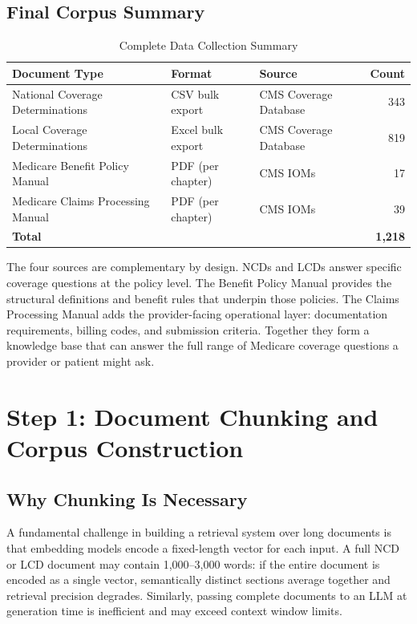 \documentclass[12pt, letterpaper]{article}
\begin{document}
\subsection{Final Corpus Summary}

\begin{table}[h]
\centering
\caption{Complete Data Collection Summary}
\label{tab:datasources}
\begin{tabular}{@{}p{4.8cm}p{3.2cm}p{3.8cm}r@{}}
\toprule
\textbf{Document Type} & \textbf{Format} & \textbf{Source} & \textbf{Count} \\
\midrule
National Coverage Determinations  & CSV bulk export   & CMS Coverage Database & 343 \\
Local Coverage Determinations     & Excel bulk export & CMS Coverage Database & 819 \\
Medicare Benefit Policy Manual    & PDF (per chapter) & CMS IOMs              & 17 \\
Medicare Claims Processing Manual & PDF (per chapter) & CMS IOMs              & 39 \\
\midrule
\textbf{Total} & & & \textbf{1,218} \\
\bottomrule
\end{tabular}
\end{table}


\noindent The four sources are complementary by design. NCDs and LCDs answer specific
coverage questions at the policy level. The Benefit Policy Manual provides the structural
definitions and benefit rules that underpin those policies. The Claims Processing Manual
adds the provider-facing operational layer: documentation requirements, billing codes,
and submission criteria. Together they form a knowledge base that can answer the full
range of Medicare coverage questions a provider or patient might ask.



\section{Step 1: Document Chunking and Corpus Construction}
\label{sec:chunking}

\subsection{Why Chunking Is Necessary}

A fundamental challenge in building a retrieval system over long documents is that
embedding models encode a fixed-length vector for each input. A full NCD or LCD
document may contain 1,000--3,000 words: if the entire document is encoded as a
single vector, semantically distinct sections average together and retrieval precision
degrades. Similarly, passing complete documents to an LLM at generation time is
inefficient and may exceed context window limits.
\end{document}
